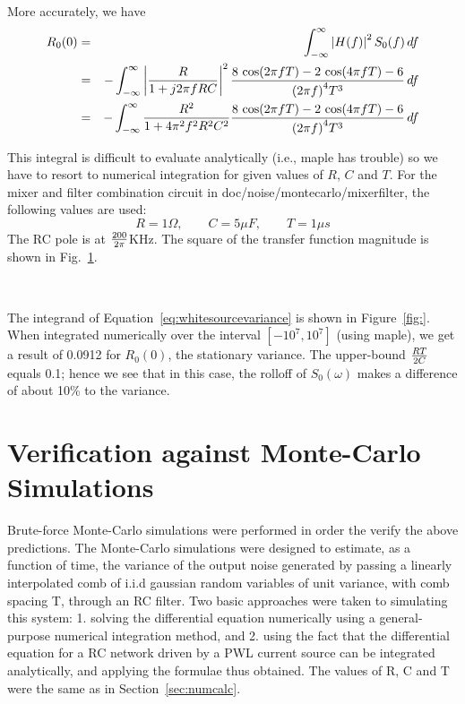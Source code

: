 \documentclass[9pt,times]{article}
\newcommand{\w}{\omega}
\begin{document}
More accurately, we have
\begin{eqnarray}
\label{eq:whitesourcevariance}
R_0(0) & = & \int_{-\infty}^\infty \left|H(f)\right|^2 S_0(f) \, df \nonumber \\
       & = & - \int_{-\infty}^\infty \left|{R\over 1+j2\pi fRC}\right|^2 {\frac
       {8\,\cos(2\pi f T)-2\,\cos(4\pi f T)-6}{{(2\pi f)}^{4}T^{3}}} \, df
       \nonumber\\
       & = & - \int_{-\infty}^\infty {R^2\over 1+4\pi^2 f^2R^2C^2}{\frac
       {8\,\cos(2\pi f T)-2\,\cos(4\pi f T)-6}{{(2\pi f)}^{4}T^{3}}} \, df 
\end{eqnarray}

This integral is difficult to evaluate analytically (i.e., {\sf maple} has
trouble) so we have to resort to numerical integration for given values of
$R$, $C$ and $T$. For the mixer and filter combination circuit in 
{\sf doc/noise/montecarlo/mixerfilter}, the following values are used:
\[
R=1\Omega, \qquad C=5\mu F,\qquad T=1\mu s
\]
The RC pole is at $200\over 2\pi$KHz. The square of the transfer function
magnitude is shown in Fig.~\ref{fig:magH2}.
\begin{figure}[htbp]
\centerline{\ }
\caption{}
\label{fig:magH2}
\end{figure}
The integrand of Equation~\ref{eq:whitesourcevariance} is shown in
Figure~\ref{fig:}. When integrated numerically  over the interval $[-10^7,
10^7]$ (using {\sf maple}), we get a result of 0.0912 for $R_0(0)$, the
stationary variance. The upper-bound $R T \over 2 C$ equals 0.1;
hence we see that in this case, the rolloff of $S_0(\w)$ makes a difference of
about 10\% to the variance.

\section{Verification against Monte-Carlo Simulations}
\label{sec:montecarlo}

Brute-force Monte-Carlo simulations were performed in order the verify the
above predictions. The Monte-Carlo simulations were designed to estimate, as
a function of time, the variance of the output noise generated by passing a
linearly interpolated comb of i.i.d gaussian random variables of unit
variance, with comb spacing T, through an RC filter. Two basic approaches
were taken to simulating this system: 1. solving the differential equation
numerically using a general-purpose numerical integration method, and 2.
using the fact that the differential equation for a RC network driven by a
PWL current source can be integrated analytically, and applying the formulae
thus obtained. The values of R, C and T were the same as in
Section~\ref{sec:numcalc}.
\end{document}
